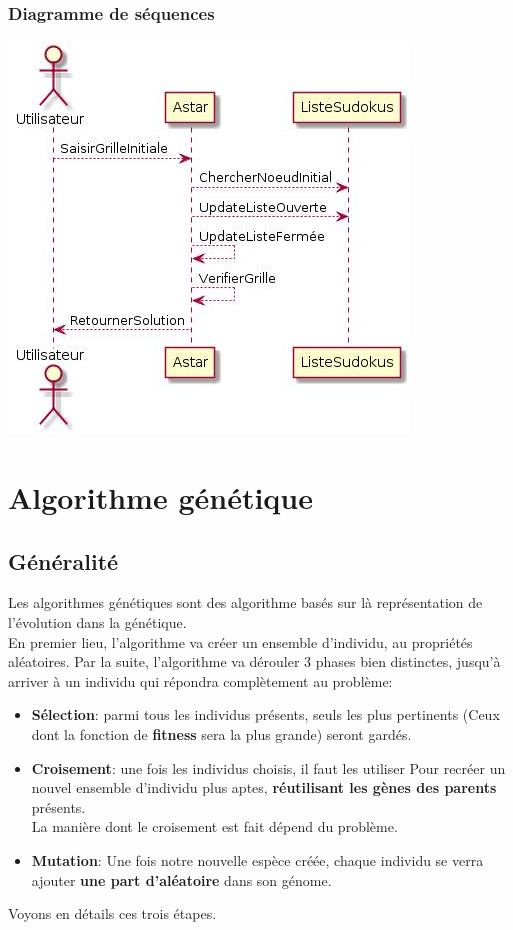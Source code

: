 \subsubsection{Diagramme de séquences}

\includegraphics[scale=0.5]{images/AstarDiagrammeSequences.png}



    \section{Algorithme génétique}
        \subsection{Généralité}
            Les algorithmes génétiques sont des algorithme basés sur là représentation de l'évolution dans la génétique.\\
            En premier lieu, l'algorithme va créer un ensemble d'individu, au propriétés aléatoires.
            Par la suite, l'algorithme va dérouler 3 phases bien distinctes, jusqu'à arriver à un individu qui répondra complètement au problème: 
            \begin{itemize}
                \item \textbf{Sélection}: parmi tous les individus présents, seuls les plus pertinents (Ceux dont la fonction de \textbf{fitness} sera la plus grande) seront gardés.
                \item \textbf{Croisement}: une fois les individus choisis, il faut les utiliser Pour recréer un nouvel ensemble d'individu plus aptes, \textbf{réutilisant les gènes des parents} présents.\\
                    La manière dont le croisement est fait dépend du problème.
                \item \textbf{Mutation}: Une fois notre nouvelle espèce créée, chaque individu se verra ajouter \textbf{une part d'aléatoire} dans son génome.
            \end{itemize}
            Voyons en détails ces trois étapes.
